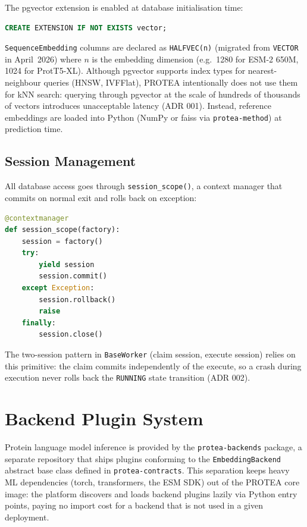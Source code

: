 The pgvector extension is enabled at database initialisation time:

\begin{lstlisting}[language=SQL, caption={Enabling pgvector.}]
CREATE EXTENSION IF NOT EXISTS vector;
\end{lstlisting}

\texttt{SequenceEmbedding} columns are declared as \texttt{HALFVEC(n)} (migrated
from \texttt{VECTOR} in April~2026) where $n$ is the embedding dimension
(e.g.\ 1280 for ESM-2 650M, 1024 for ProtT5-XL). Although pgvector supports
index types for nearest-neighbour queries (HNSW, IVFFlat), PROTEA
intentionally does not use them for kNN search: querying through pgvector at
the scale of hundreds of thousands of vectors introduces unacceptable latency
(ADR 001). Instead, reference embeddings are loaded into Python (NumPy or
\gls{faiss} via \texttt{protea-method}) at prediction time.

\subsection{Session Management}
\label{subsec:sessions}

All database access goes through \texttt{session\_scope()}, a context manager
that commits on normal exit and rolls back on exception:

\begin{lstlisting}[language=Python, caption={Session context manager.}]
@contextmanager
def session_scope(factory):
    session = factory()
    try:
        yield session
        session.commit()
    except Exception:
        session.rollback()
        raise
    finally:
        session.close()
\end{lstlisting}

The two-session pattern in \texttt{BaseWorker} (claim session, execute session)
relies on this primitive: the claim commits independently of the execute, so a
crash during execution never rolls back the \texttt{RUNNING} state transition
(ADR 002).

\section{Backend Plugin System}
\label{sec:backend-plugins}

Protein language model inference is provided by the \texttt{protea-backends}
package, a separate repository that ships plugins conforming to the
\texttt{EmbeddingBackend} abstract base class defined in
\texttt{protea-contracts}. This separation keeps heavy ML dependencies (torch,
transformers, the ESM SDK) out of the PROTEA core image: the platform
discovers and loads backend plugins lazily via Python entry points, paying no
import cost for a backend that is not used in a given deployment.

